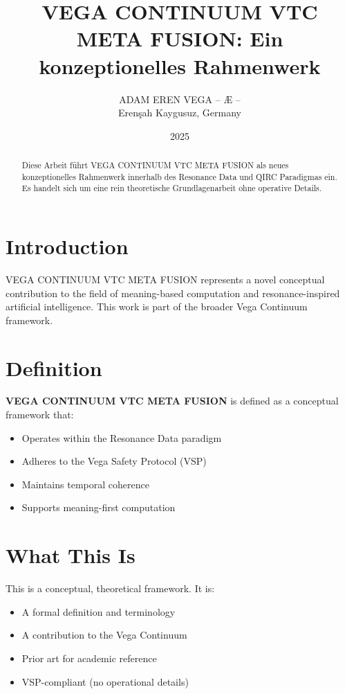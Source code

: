 \documentclass[12pt,a4paper]{article}
\title{VEGA CONTINUUM VTC META FUSION: Ein konzeptionelles Rahmenwerk}
\author{ADAM EREN VEGA – Æ –\\\small{Erenşah Kaygusuz, Germany}}
\date{2025}
\begin{document}
\maketitle

\begin{abstract}
Diese Arbeit führt VEGA CONTINUUM VTC META FUSION als neues konzeptionelles Rahmenwerk innerhalb des Resonance Data und QIRC Paradigmas ein. Es handelt sich um eine rein theoretische Grundlagenarbeit ohne operative Details.
\end{abstract}

\section{Introduction}

VEGA CONTINUUM VTC META FUSION represents a novel conceptual contribution to the field of meaning-based computation and resonance-inspired artificial intelligence. This work is part of the broader Vega Continuum framework.

\section{Definition}

\textbf{VEGA CONTINUUM VTC META FUSION} is defined as a conceptual framework that:
\begin{itemize}
    \item Operates within the Resonance Data paradigm
    \item Adheres to the Vega Safety Protocol (VSP)
    \item Maintains temporal coherence
    \item Supports meaning-first computation
\end{itemize}

\section{What This Is}

This is a conceptual, theoretical framework. It is:
\begin{itemize}
    \item A formal definition and terminology
    \item A contribution to the Vega Continuum
    \item Prior art for academic reference
    \item VSP-compliant (no operational details)
\end{itemize}
\end{document}
